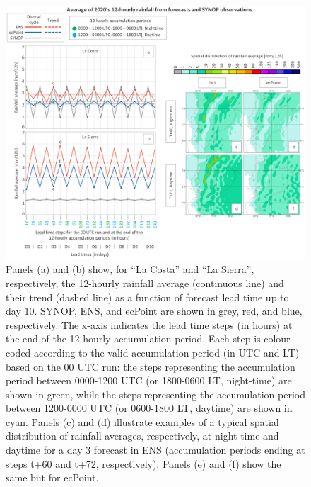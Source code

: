 \documentclass[techmemo]{ecmwfrep}%
\begin{document}
\begin{figure}
\centering
\includegraphics[width=\textwidth]{Figures/06_DATA_Annual_Average_Rainfall.png}
\caption{Panels (a) and (b) show, for “La Costa” and “La Sierra”, respectively, the 12-hourly rainfall average (continuous line) and their trend (dashed line)  as a function of forecast lead time up to day 10. SYNOP, ENS, and ecPoint are shown in grey, red, and blue, respectively. The x-axis indicates the lead time steps (in hours) at the end of the 12-hourly accumulation period. Each step is colour-coded according to the valid accumulation period (in UTC and LT) based on the 00 UTC run: the steps representing the accumulation period between 0000-1200 UTC (or 1800-0600 LT, night-time) are shown in green, while the steps representing the accumulation period between 1200-0000 UTC (or 0600-1800 LT, daytime) are shown in cyan. Panels (c) and (d) illustrate examples of a typical spatial distribution of rainfall averages, respectively, at night-time and daytime for a day 3 forecast in ENS (accumulation periods ending at steps t+60 and t+72, respectively). Panels (e) and (f) show the same but for ecPoint.}
\label{fig:Annual_Average_Rain}
\end{figure}
\end{document}
